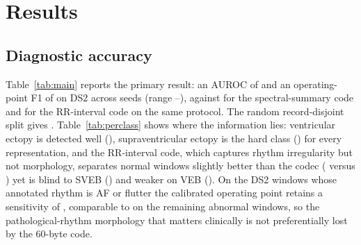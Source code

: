 \documentclass[journal]{IEEEtran}
\begin{document}
\section{Results}
\subsection{Diagnostic accuracy}\label{sec:accuracy}
\begin{table}[!t]
\centering
\caption{Diagnostic performance on the fixed DS2 test set (de Chazal protocol, \nSeeds{} seeds) and under the random record-disjoint split. Classical codes are read by logistic regression from 8-bit quantized 22-coefficient codes.}
\label{tab:main}
\footnotesize
\resizebox{\textwidth}{!}{}
\end{table}
\begin{table}[!t]
\centering
\caption{Per-class discrimination on DS2 and sensitivity of the calibrated operating point on windows annotated as atrial fibrillation or flutter.}
\label{tab:perclass}
\small
\resizebox{\columnwidth}{!}{}
\end{table}
Table~\ref{tab:main} reports the primary result: an AUROC of \mainAUROC{} and an operating-point F1 of \mainFop{} on DS2 across \nSeeds{} seeds (range \mainAUROCmin{}--\mainAUROCmax{}), against \summaryAUROC{} for the spectral-summary code and \rrAUROC{} for the RR-interval code on the same protocol. The random record-disjoint split gives \randAUROC{}. Table~\ref{tab:perclass} shows where the information lies: ventricular ectopy is detected well (\pcVEB{}), supraventricular ectopy is the hard class (\pcSVEB{}) for every representation, and the RR-interval code, which captures rhythm irregularity but not morphology, separates normal windows slightly better than the codec (\rrNormal{} versus \pcNormal{}) yet is blind to SVEB (\rrSVEB{}) and weaker on VEB (\rrVEB{}). On the \afibN{} DS2 windows whose annotated rhythm is AF or flutter the calibrated operating point retains a sensitivity of \afibSens{}, comparable to \otherSens{} on the remaining abnormal windows, so the pathological-rhythm morphology that matters clinically is not preferentially lost by the 60-byte code.
\end{document}
